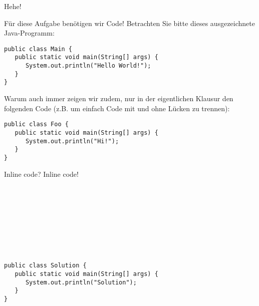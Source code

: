 \begin{task}[5]{Hehe!}
\label{ex:second}%

Für diese Aufgabe benötigen wir Code!
Betrachten Sie bitte dieses ausgezeichnete Java-Programm:

\begin{verbatim}
public class Main {
   public static void main(String[] args) {
      System.out.println("Hello World!");
   }
}
\end{verbatim}

\ifexam
Warum auch immer zeigen wir zudem, nur in der eigentlichen Klausur den folgenden Code (z.B. um einfach Code mit und ohne Lücken zu trennen):

\begin{verbatim}
public class Foo {
   public static void main(String[] args) {
      System.out.println("Hi!");
   }
}
\end{verbatim}
\bigskip

\IndentGuides{9cm}

\IndentGuidesDistance{0.5cm}
\IndentGuides[4]{5cm}

\fi


Inline code? Inline code!

\\
\\
\\
\\
\\
\\
\\

\begin{solution}
\begin{verbatim}
public class Solution {
   public static void main(String[] args) {
      System.out.println("Solution");
   }
}
\end{verbatim}
\end{solution}


\end{task}
